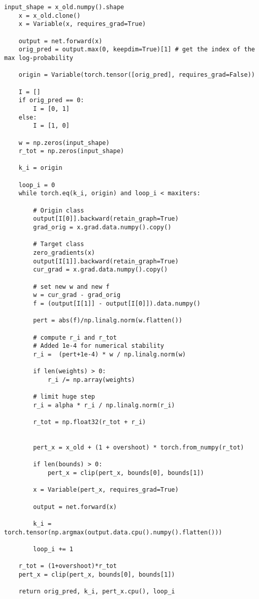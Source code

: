 \begin{lstlisting}[style=python, caption=LowProFool関数などが記載されているAdverse.py]
    input_shape = x_old.numpy().shape
    x = x_old.clone()
    x = Variable(x, requires_grad=True)
    
    output = net.forward(x)
    orig_pred = output.max(0, keepdim=True)[1] # get the index of the max log-probability

    origin = Variable(torch.tensor([orig_pred], requires_grad=False))

    I = []
    if orig_pred == 0:
        I = [0, 1]
    else:
        I = [1, 0]
        
    w = np.zeros(input_shape)
    r_tot = np.zeros(input_shape)
    
    k_i = origin
 
    loop_i = 0
    while torch.eq(k_i, origin) and loop_i < maxiters:
                
        # Origin class
        output[I[0]].backward(retain_graph=True)
        grad_orig = x.grad.data.numpy().copy()
        
        # Target class
        zero_gradients(x)
        output[I[1]].backward(retain_graph=True)
        cur_grad = x.grad.data.numpy().copy()
            
        # set new w and new f
        w = cur_grad - grad_orig
        f = (output[I[1]] - output[I[0]]).data.numpy()

        pert = abs(f)/np.linalg.norm(w.flatten())
    
        # compute r_i and r_tot
        # Added 1e-4 for numerical stability
        r_i =  (pert+1e-4) * w / np.linalg.norm(w)   
        
        if len(weights) > 0:
            r_i /= np.array(weights)

        # limit huge step
        r_i = alpha * r_i / np.linalg.norm(r_i) 
            
        r_tot = np.float32(r_tot + r_i)
        
        
        pert_x = x_old + (1 + overshoot) * torch.from_numpy(r_tot)

        if len(bounds) > 0:
            pert_x = clip(pert_x, bounds[0], bounds[1])
                
        x = Variable(pert_x, requires_grad=True)
 
        output = net.forward(x)
        
        k_i = torch.tensor(np.argmax(output.data.cpu().numpy().flatten()))
                    
        loop_i += 1

    r_tot = (1+overshoot)*r_tot    
    pert_x = clip(pert_x, bounds[0], bounds[1])

    return orig_pred, k_i, pert_x.cpu(), loop_i

\end{lstlisting}